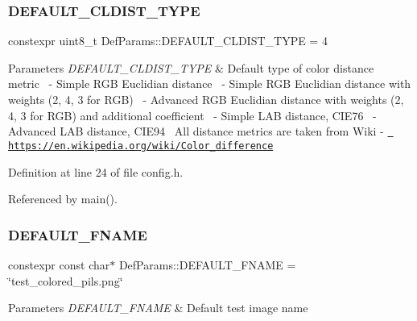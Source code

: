 \subsubsection{\texorpdfstring{DEFAULT\_CLDIST\_TYPE}{DEFAULT\_CLDIST\_TYPE}}
{\footnotesize\ttfamily constexpr uint8\+\_\+t Def\+Params\+::\+D\+E\+F\+A\+U\+L\+T\+\_\+\+C\+L\+D\+I\+S\+T\+\_\+\+T\+Y\+PE = 4}


\begin{DoxyParams}{Parameters}
{\em D\+E\+F\+A\+U\+L\+T\+\_\+\+C\+L\+D\+I\+S\+T\+\_\+\+T\+Y\+PE} & Default type of color distance metric~ -\/ Simple R\+GB Euclidian distance~ -\/ Simple R\+GB Euclidian distance with weights (2, 4, 3 for R\+GB)~ -\/ Advanced R\+GB Euclidian distance with weights (2, 4, 3 for R\+GB) and additional coefficient~ -\/ Simple L\+AB distance, C\+I\+E76~ -\/ Advanced L\+AB distance, C\+I\+E94~\newline
All distance metrics are taken from Wiki -\/ \href{https://en.wikipedia.org/wiki/Color_difference}{\texttt{ https\+://en.\+wikipedia.\+org/wiki/\+Color\+\_\+difference}} \\
\hline
\end{DoxyParams}


Definition at line 24 of file config.\+h.



Referenced by main().

\mbox{\label{namespace_def_params_a4ecb94d634ccb0839d655d8b4d49f10e}} 
\subsubsection{\texorpdfstring{DEFAULT\_FNAME}{DEFAULT\_FNAME}}
{\footnotesize\ttfamily constexpr const char$\ast$ Def\+Params\+::\+D\+E\+F\+A\+U\+L\+T\+\_\+\+F\+N\+A\+ME = \char`\"{}test\+\_\+colored\+\_\+pils.\+png\char`\"{}}


\begin{DoxyParams}{Parameters}
{\em D\+E\+F\+A\+U\+L\+T\+\_\+\+F\+N\+A\+ME} & Default test image name \\
\hline
\end{DoxyParams}


